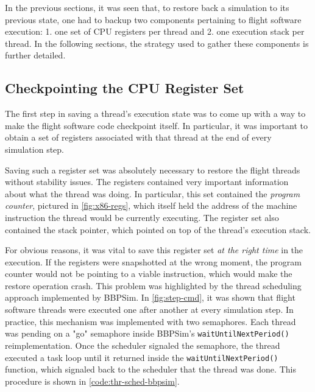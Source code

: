 In the previous sections, it was seen that, to restore back a simulation to its previous state, one had to backup two components pertaining to flight software execution: 1. one set of CPU registers per thread and 2. one execution stack per thread. In the following sections, the strategy used to gather these components is further detailed.

\subsection*{Checkpointing the CPU Register Set}
The first step in saving a thread's execution state was to come up with a way to make the flight software code checkpoint itself. In particular, it was important to obtain a set of registers associated with that thread at the end of every simulation step.

Saving such a register set was absolutely necessary to restore the flight threads without stability issues. The registers contained very important information about what the thread was doing. In particular, this set contained the \textit{program counter}, pictured in \autoref{fig:x86-regs}, which itself held the address of the machine instruction the thread would be currently executing. The register set also contained the stack pointer, which pointed on top of the thread's execution stack.

For obvious reasons, it was vital to save this register set \textit{at the right time} in the execution. If the registers were snapshotted at the wrong moment, the program counter would not be pointing to a viable instruction, which would make the restore operation crash. This problem was highlighted by the thread scheduling approach implemented by BBPSim. In \autoref{fig:step-cmd}, it was shown that flight software threads were executed one after another at every simulation step. In practice, this mechanism was implemented with two semaphores. Each thread was pending on a "go" semaphore inside BBPSim's \texttt{waitUntilNextPeriod()} reimplementation. Once the scheduler signaled the semaphore, the thread executed a task loop until it returned inside the \texttt{waitUntilNextPeriod()} function, which signaled back to the scheduler that the thread was done. This procedure is shown in \autoref{code:thr-sched-bbpsim}.


